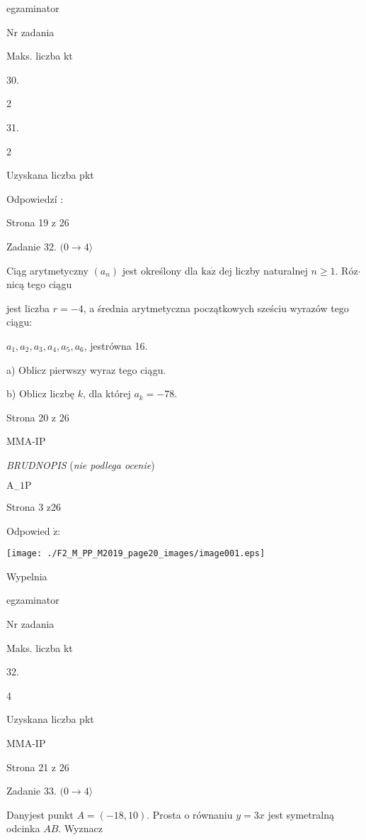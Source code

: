 \documentclass[a4paper,12pt]{article}
\begin{document}
egzaminator

Nr zadania

Maks. liczba kt

30.

2

31.

2

Uzyskana liczba pkt

Odpowiedzí :

Strona 19 z 26





Zadanie 32. $(0\rightarrow 4\rangle$

Ciąg arytmetyczny $(a_{n})$ jest określony dla $\mathrm{k}\mathrm{a}\dot{\mathrm{z}}$ dej liczby naturalnej $n\geq 1$. Róz$\cdot$nicą tego ciągu

jest liczba $r=-4$, a średnia arytmetyczna początkowych sześciu wyrazów tego ciągu:

$a_{1}, a_{2}, a_{3}, a_{4}, a_{5}, a_{6}$, jestrówna 16.

a) Oblicz pierwszy wyraz tego ciągu.

b) Oblicz liczbę $k$, dla której $a_{k}=-78.$

Strona 20 z 26

MMA-IP





{\it BRUDNOPIS} ({\it nie podlega ocenie})

$\mathrm{A}_{-}1\mathrm{P}$

Strona 3 z26





Odpowied $\acute{\mathrm{z}}$:
\begin{center}
\texttt{[image: ./F2\_M\_PP\_M2019\_page20\_images/image001.eps]}
\end{center}
Wypelnia

egzaminator

Nr zadania

Maks. liczba kt

32.

4

Uzyskana liczba pkt

MMA-IP

Strona 21 z 26





Zadanie 33. $(0\rightarrow 4\rangle$

Danyjest punkt $A=(-18,10)$. Prosta o równaniu $y=3x$ jest symetralną odcinka $AB$. Wyznacz
\end{document}
